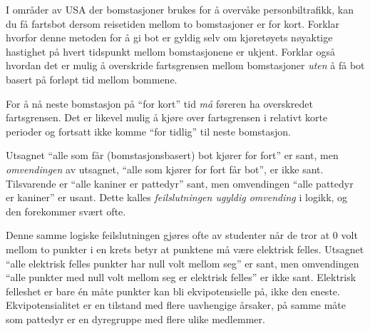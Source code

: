 

I områder av USA der bomstasjoner brukes for å overvåke personbiltrafikk, kan du få fartsbot dersom reisetiden mellom to bomstasjoner er for kort. Forklar hvorfor denne metoden for å gi bot er gyldig selv om kjøretøyets nøyaktige hastighet på hvert tidspunkt mellom bomstasjonene er ukjent. Forklar også hvordan det er mulig å overskride fartsgrensen mellom bomstasjoner {\it uten} å få bot basert på forløpt tid mellom bommene.







For å nå neste bomstasjon på ``for kort'' tid {\it må} føreren ha overskredet fartsgrensen. Det er likevel mulig å kjøre over fartsgrensen i relativt korte perioder og fortsatt ikke komme ``for tidlig'' til neste bomstasjon.







Utsagnet ``alle som får (bomstasjonsbasert) bot kjører for fort'' er sant, men {\it omvendingen} av utsagnet, ``alle som kjører for fort får bot'', er ikke sant. Tilsvarende er ``alle kaniner er pattedyr'' sant, men omvendingen ``alle pattedyr er kaniner'' er usant. Dette kalles {\it feilslutningen ugyldig omvending} i logikk, og den forekommer svært ofte.

Denne samme logiske feilslutningen gjøres ofte av studenter når de tror at 0 volt mellom to punkter i en krets betyr at punktene må være elektrisk felles. Utsagnet ``alle elektrisk felles punkter har null volt mellom seg'' er sant, men omvendingen ``alle punkter med null volt mellom seg er elektrisk felles'' er ikke sant. Elektrisk felleshet er bare én måte punkter kan bli ekvipotensielle på, ikke den eneste. Ekvipotensialitet er en tilstand med flere uavhengige årsaker, på samme måte som pattedyr er en dyregruppe med flere ulike medlemmer.



